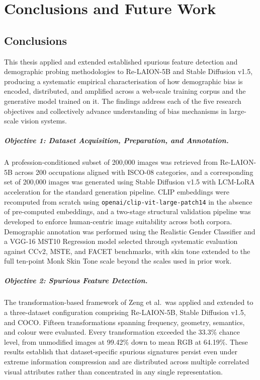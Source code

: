 \chapter{Conclusions and Future Work}
\label{chp:conclusions}

\section{Conclusions}
\label{sec:conclusions}

This thesis applied and extended established spurious feature detection and demographic
probing methodologies to Re-LAION-5B and Stable Diffusion v1.5, producing a systematic
empirical characterisation of how demographic bias is encoded, distributed, and amplified
across a web-scale training corpus and the generative model trained on it. The findings
address each of the five research objectives and collectively advance understanding of
bias mechanisms in large-scale vision systems.

\paragraph{Objective 1: Dataset Acquisition, Preparation, and Annotation.}
A profession-conditioned subset of 200,000 images was retrieved from Re-LAION-5B across
200 occupations aligned with ISCO-08 categories, and a corresponding set of 200,000 images
was generated using Stable Diffusion v1.5 with LCM-LoRA acceleration for the standard
generation pipeline. CLIP embeddings were recomputed from scratch using
\texttt{openai/clip-vit-large-patch14} in the absence of pre-computed embeddings, and a
two-stage structural validation pipeline was developed to enforce human-centric image
suitability across both corpora. Demographic annotation was performed using the Realistic
Gender Classifier and a VGG-16 MST10 Regression model selected through systematic
evaluation against CCv2, MSTE, and FACET benchmarks, with skin tone extended to the full
ten-point Monk Skin Tone scale beyond the scales used in prior work.

\paragraph{Objective 2: Spurious Feature Detection.}
The transformation-based framework of Zeng et al.\ was applied and extended to a
three-dataset configuration comprising Re-LAION-5B, Stable Diffusion v1.5, and COCO.
Fifteen transformations spanning frequency, geometry, semantics, and colour were
evaluated. Every transformation exceeded the 33.3\% chance level, from unmodified images
at 99.42\% down to mean RGB at 64.19\%. These results establish that dataset-specific
spurious signatures persist even under extreme information compression and are distributed
across multiple correlated visual attributes rather than concentrated in any single
representation.

